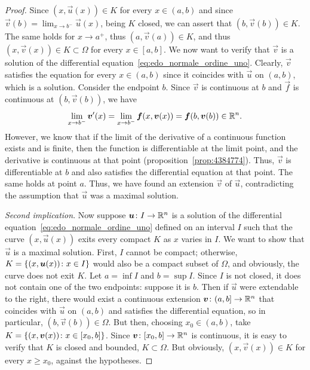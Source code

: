 \begin{proof}
Since $(x,\vec u(x)) \in K$ for every $x\in(a,b)$ and since $\vec v(b) =
\lim_{x\to b^-}\vec u(x)$, being $K$ closed, we can assert that $(b,\vec v(b))
\in K$. The same holds for $x\to a^+$, thus $(a,\vec v(a))\in K$, and thus
$(x,\vec v(x))\in K \subset \Omega$ for every $x\in [a,b]$. We now want to
verify that $\vec v$ is a solution of the differential
equation~\eqref{eq:edo_normale_ordine_uno}. Clearly, $\vec v$ satisfies the
equation for every $x\in (a,b)$ since it coincides with $\vec u$ on $(a,b)$,
which is a solution. Consider the endpoint $b$. Since $\vec v$ is continuous at
$b$ and $\vec f$ is continuous at $(b,\vec v(b))$, we have
\[
  \lim_{x\to b^-} \boldsymbol v'(x)
  = \lim_{x\to b^-} \boldsymbol f(x,\boldsymbol v(x))
  = \boldsymbol f(b,\boldsymbol v(b)) \in {\mathbb R}^n.
\]
However, we know that if the limit of the derivative of a continuous function
exists and is finite, then the function is differentiable at the limit point,
and the derivative is continuous at that point (proposition~\ref{prop:4384774}).
Thus, $\vec v$ is differentiable at $b$ and also satisfies the differential
equation at that point. The same holds at point $a$. Thus, we have found an
extension $\vec v$ of $\vec u$, contradicting the assumption that $\vec u$ was a
maximal solution.

\emph{Second implication}. Now suppose $\boldsymbol u\colon I\to {\mathbb R}^n$ is a solution of the differential equation~\eqref{eq:edo_normale_ordine_uno} defined on an interval $I$ such that the curve $(x,\vec u(x))$ exits every compact $K$ as $x$ varies in $I$. We want to show that $\vec u$ is a maximal solution. First, $I$ cannot be compact; otherwise, $K={\left\{ (x,\boldsymbol u(x))\colon x \in I \right\}}$ would also be a compact subset of $\Omega$, and obviously, the curve does not exit $K$. Let $a=\inf I$ and $b=\sup I$. Since $I$ is not closed, it does not contain one of the two endpoints: suppose it is $b$. Then if $\vec u$ were extendable to the right, there would exist a continuous extension $\boldsymbol v\colon (a,b]\to {\mathbb R}^n$ that coincides with $\vec u$ on $(a,b)$ and satisfies the differential equation, so in particular, $(b,\vec v(b))\in \Omega$. But then, choosing $x_0 \in (a,b)$, take $K={\left\{ (x,\boldsymbol v(x))\colon x\in [x_0,b] \right\}}$. Since $\boldsymbol v\colon[x_0,b]\to {\mathbb R}^n$ is continuous, it is easy to verify that $K$ is closed and bounded, $K\subset \Omega$. But obviously, $(x,\vec v(x))\in K$ for every $x\ge x_0$, against the hypotheses.
\end{proof}

